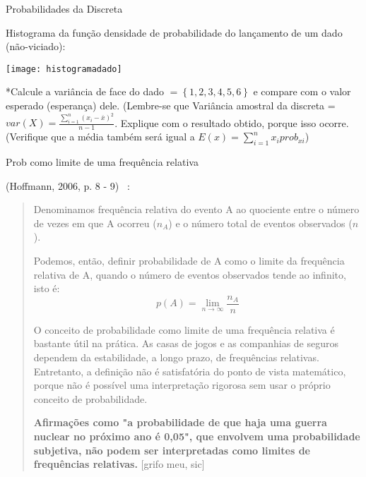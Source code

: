 \documentclass{beamer}
\begin{document}
\begin{frame}{Probabilidades da Discreta}
\vspace{-.5cm}
\footnotesize

Histograma da função densidade de probabilidade do lançamento de um dado (não-viciado):

\begin{center}
\texttt{[image: histogramadado]}
\end{center}

*Calcule a variância de face do dado $=\left\{1,2,3,4,5,6\right\}$ e compare com o valor esperado (esperança) dele. (Lembre-se que Variância amostral da discreta = $var(X)=\frac{\sum^{n}_{i=1}(x_{i}-\overline{x})^2}{n-1}$. Explique com o resultado obtido, porque isso ocorre.(Verifique que a média também será igual a $E(x)=\sum_{i=1}^{n}x_{i}prob_{xi}$)

\end{frame}
\begin{frame}{Prob como limite de uma frequência relativa}

\vspace{-.5cm}
\footnotesize
(Hoffmann, 2006, p. 8 - 9)~\cite{hoffmann} :
\begin{quote}
    Denominamos frequência relativa do evento A ao quociente entre o número de vezes em que A ocorreu ($n_{A}$) e o número total de eventos observados ($n$).
    
    Podemos, então, definir probabilidade de A como o limite da frequência relativa de A, quando o número de eventos observados tende ao infinito, isto é:
    $$
    p(A)=\lim_{n\to\infty}\frac{n_{A}}{n}
    $$
    
    O conceito de probabilidade como limite de uma frequência relativa é bastante útil na prática. As casas de jogos e as companhias de seguros dependem da estabilidade, a longo prazo, de frequências relativas. Entretanto, a definição não é satisfatória do ponto de vista matemático, porque não é possível uma interpretação rigorosa sem usar o próprio conceito de probabilidade.
    
    \textbf{Afirmações como "a probabilidade de que haja uma guerra nuclear no próximo ano é 0,05", que envolvem uma probabilidade subjetiva, não podem ser interpretadas como limites de frequências relativas.} [grifo meu, sic] %
\end{quote}


\end{frame}
\end{document}

